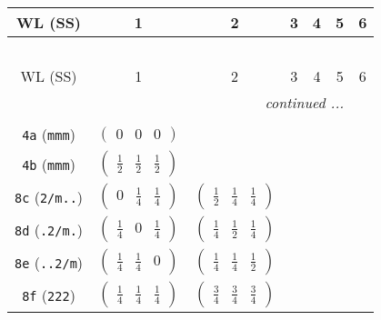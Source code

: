 \documentclass[fleqn,9pt,landscape]{jsarticle}
\begin{document}
\begin{center}
\renewcommand{\arraystretch}{1.2}
\begin{longtable}{ccccccc}
 \hline \hline
WL (SS) & 1 & 2 & 3 & 4 & 5 & 6 \\ \hline \endfirsthead

\multicolumn{6}{l}{\tablename\ \thetable{}} \\
 \hline \hline
WL (SS) & 1 & 2 & 3 & 4 & 5 & 6 \\ \hline \endhead

 \hline \hline
\multicolumn{6}{r}{\footnotesize\it continued ...} \\ \endfoot

 \hline \hline
\multicolumn{6}{r}{} \\ \endlastfoot

{\tt 4a} ({\tt mmm}) & $ \begin{pmatrix} 0 & 0 & 0 \end{pmatrix} $ & $  $ & $  $ & $  $ & $  $ & $  $ \\ \hline
{\tt 4b} ({\tt mmm}) & $ \begin{pmatrix} \frac{1}{2} & \frac{1}{2} & \frac{1}{2} \end{pmatrix} $ & $  $ & $  $ & $  $ & $  $ & $  $ \\ \hline
{\tt 8c} ({\tt 2/m..}) & $ \begin{pmatrix} 0 & \frac{1}{4} & \frac{1}{4} \end{pmatrix} $ & $ \begin{pmatrix} \frac{1}{2} & \frac{1}{4} & \frac{1}{4} \end{pmatrix} $ & $  $ & $  $ & $  $ & $  $ \\ \hline
{\tt 8d} ({\tt .2/m.}) & $ \begin{pmatrix} \frac{1}{4} & 0 & \frac{1}{4} \end{pmatrix} $ & $ \begin{pmatrix} \frac{1}{4} & \frac{1}{2} & \frac{1}{4} \end{pmatrix} $ & $  $ & $  $ & $  $ & $  $ \\ \hline
{\tt 8e} ({\tt ..2/m}) & $ \begin{pmatrix} \frac{1}{4} & \frac{1}{4} & 0 \end{pmatrix} $ & $ \begin{pmatrix} \frac{1}{4} & \frac{1}{4} & \frac{1}{2} \end{pmatrix} $ & $  $ & $  $ & $  $ & $  $ \\ \hline
{\tt 8f} ({\tt 222}) & $ \begin{pmatrix} \frac{1}{4} & \frac{1}{4} & \frac{1}{4} \end{pmatrix} $ & $ \begin{pmatrix} \frac{3}{4} & \frac{3}{4} & \frac{3}{4} \end{pmatrix} $ & $  $ & $  $ & $  $ & $  $ \\ \hline

\end{longtable}
\end{center}
\end{document}
